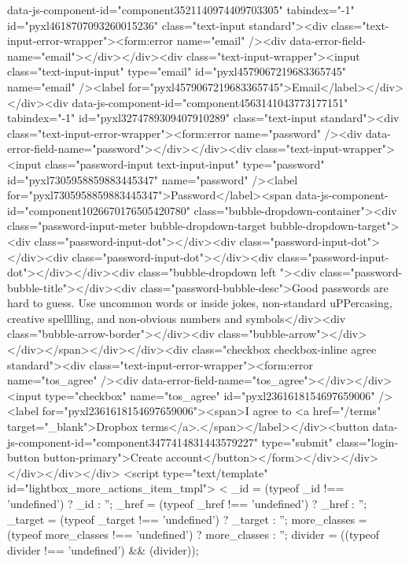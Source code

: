 {data-js-component-id="component3521140974409703305" tabindex="-1" id="pyxl4618707093260015236" class="text-input  standard"><div class="text-input-error-wrapper"><form:error name="email" /><div data-error-field-name="email"></div></div><div class="text-input-wrapper"><input class="text-input-input" type="email" id="pyxl4579067219683365745" name="email" /><label for="pyxl4579067219683365745">Email</label></div></div><div data-js-component-id="component4563141043773177151" tabindex="-1" id="pyxl3274789309407910289" class="text-input  standard"><div class="text-input-error-wrapper"><form:error name="password" /><div data-error-field-name="password"></div></div><div class="text-input-wrapper"><input class="password-input text-input-input" type="password" id="pyxl7305958859883445347" name="password" /><label for="pyxl7305958859883445347">Password</label><span data-js-component-id="component1026670176505420780" class="bubble-dropdown-container"><div class="password-input-meter bubble-dropdown-target bubble-dropdown-target"><div class="password-input-dot"></div><div class="password-input-dot"></div><div class="password-input-dot"></div><div class="password-input-dot"></div></div><div class="bubble-dropdown left "><div class="password-bubble-title"></div><div class="password-bubble-desc">Good passwords are hard to guess. Use uncommon words or inside jokes, non-standard uPPercasing, creative spelllling, and non-obvious numbers and symbols</div><div class="bubble-arrow-border"></div><div class="bubble-arrow"></div></div></span></div></div><div class="checkbox checkbox-inline agree standard"><div class="text-input-error-wrapper"><form:error name="tos_agree" /><div data-error-field-name="tos_agree"></div></div><input type="checkbox" name="tos_agree" id="pyxl2361618154697659006" /><label for="pyxl2361618154697659006"><span>I agree to <a href="/terms" target="_blank">Dropbox terms</a>.</span></label></div><button data-js-component-id="component3477414831443579227" type="submit" class="login-button button-primary">Create account</button></form></div></div></div></div></div>
<script type="text/template" id="lightbox_more_actions_item_tmpl">
<%
  _id = (typeof _id !== 'undefined') ? _id : '';
  _href = (typeof _href !== 'undefined') ? _href : '';
  _target = (typeof _target !== 'undefined') ? _target : '';
  more_classes = (typeof more_classes !== 'undefined') ? more_classes : '';
  divider = ((typeof divider !== 'undefined') && (divider));

}
